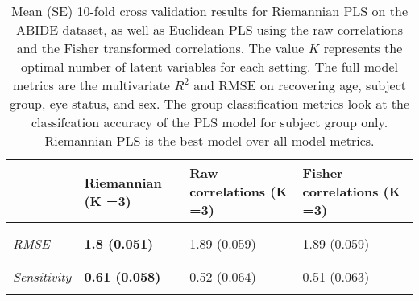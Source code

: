 \documentclass[
]{article}
\begin{document}
\begin{table}[htbp]

\caption{\label{tab:abide_cv_compare}Mean (SE) 10-fold cross validation results for Riemannian PLS on the ABIDE dataset, as well as Euclidean PLS using the raw correlations and the Fisher transformed correlations.  The value $K$ represents the optimal number of latent variables for each setting.  The full model metrics are the multivariate $R^2$ and RMSE on recovering age, subject group, eye status, and sex.  The group classification metrics look at the classifcation accuracy of the PLS model for subject group only.  Riemannian PLS is the best model over all model metrics.}
\centering
\begin{tabular}[t]{>{}l|>{}lll}
\toprule
 & Riemannian (K =3) & Raw correlations (K =3) & Fisher correlations (K =3)\\
\midrule
\addlinespace[0.3em]
\multicolumn{4}{l}{\textbf{Full model metrics (SE)}}\\
\em{\hspace{1em}\cellcolor{gray!6}{\$R\textasciicircum{}2\$}} & \textbf{\cellcolor{gray!6}{0.15 (0.015)}} & \cellcolor{gray!6}{0.07 (0.016)} & \cellcolor{gray!6}{0.07 (0.016)}\\
\em{\hspace{1em}RMSE} & \textbf{1.8 (0.051)} & 1.89 (0.059) & 1.89 (0.059)\\
\addlinespace[0.3em]
\multicolumn{4}{l}{\textbf{Group classification (SE)}}\\
\em{\hspace{1em}\cellcolor{gray!6}{Accuracy}} & \textbf{\cellcolor{gray!6}{0.58 (0.027)}} & \cellcolor{gray!6}{0.55 (0.032)} & \cellcolor{gray!6}{0.54 (0.032)}\\
\em{\hspace{1em}Sensitivity} & \textbf{0.61 (0.058)} & 0.52 (0.064) & 0.51 (0.063)\\
\em{\hspace{1em}\cellcolor{gray!6}{Specificity}} & \textbf{\cellcolor{gray!6}{0.53 (0.063)}} & \cellcolor{gray!6}{0.58 (0.065)} & \cellcolor{gray!6}{0.58 (0.065)}\\
\bottomrule
\end{tabular}
\end{table}
\end{document}
